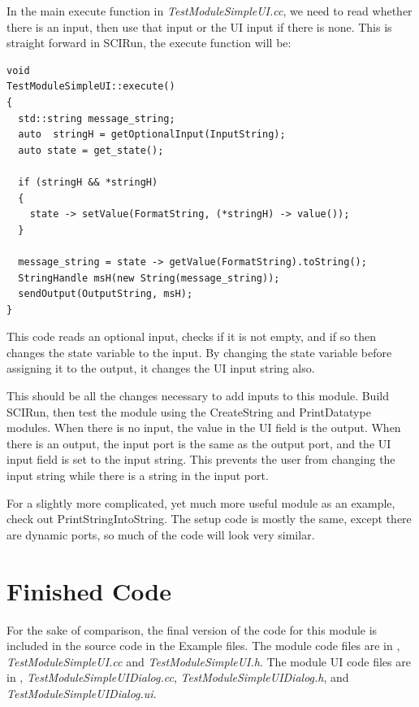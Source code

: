 \documentclass[fleqn,11pt,openany]{book}
\begin{document}
In the main execute function in \emph{TestModuleSimpleUI.cc}, we need to read whether there is an input, then use that input or the UI input if there is none.  
This is straight forward in SCIRun, the execute function will be:
\begin{verbatim}
void
TestModuleSimpleUI::execute()
{
  std::string message_string;
  auto  stringH = getOptionalInput(InputString);
  auto state = get_state();
  
  if (stringH && *stringH)
  {
    state -> setValue(FormatString, (*stringH) -> value());
  }
  
  message_string = state -> getValue(FormatString).toString();
  StringHandle msH(new String(message_string));
  sendOutput(OutputString, msH);
}
\end{verbatim}
This code reads an optional input, checks if it is not empty, and if so then changes the state variable to the input.  
By changing the state variable before assigning it to the output, it changes the UI input string also.  

This should be all the changes necessary to add inputs to this module.
Build SCIRun, then test the module using the CreateString and PrintDatatype modules.  
When there is no input, the value in the UI field is the output.  
When there is an output, the input port is the same as the output port, and the UI input field is set to the input string.  
This prevents the user from changing the input string while there is a string in the input port.  

For a slightly more complicated, yet much more useful module as an example, check out PrintStringIntoString.
The setup code is mostly the same, except there are dynamic ports, so much of the code will look very similar.  
 
\section{Finished Code}
\label{sec:finished}

For the sake of comparison, the final version of the code for this module is included in the source code in the Example files.
The module code files are in \emph{}, \emph{TestModuleSimpleUI.cc} and \emph{TestModuleSimpleUI.h}.
The module UI code files are in \emph{}, \emph{TestModuleSimpleUIDialog.cc}, \emph{TestModuleSimpleUIDialog.h}, and \emph{TestModuleSimpleUIDialog.ui}.  


\end{document}
